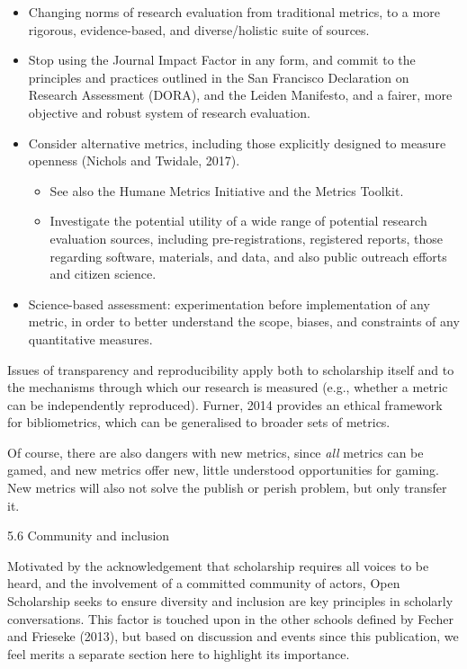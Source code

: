 \documentclass[]{article}
\begin{document}
\begin{itemize}
\item
  Changing norms of research evaluation from traditional metrics, to a
  more rigorous, evidence-based, and diverse/holistic suite of sources.
\item
  Stop using the Journal Impact Factor in any form, and commit to the
  principles and practices outlined in the San Francisco Declaration on
  Research Assessment (DORA), and the Leiden Manifesto, and a fairer,
  more objective and robust system of research evaluation.
\item
  Consider alternative metrics, including those explicitly designed to
  measure openness (Nichols and Twidale, 2017).

  \begin{itemize}
  \item
    See also the Humane Metrics Initiative and the Metrics Toolkit.
  \item
    Investigate the potential utility of a wide range of potential
    research evaluation sources, including pre-registrations, registered
    reports, those regarding software, materials, and data, and also
    public outreach efforts and citizen science.
  \end{itemize}
\item
  Science-based assessment: experimentation before implementation of any
  metric, in order to better understand the scope, biases, and
  constraints of any quantitative measures.
\end{itemize}

Issues of transparency and reproducibility apply both to scholarship
itself and to the mechanisms through which our research is measured
(e.g., whether a metric can be independently reproduced). Furner, 2014
provides an ethical framework for bibliometrics, which can be
generalised to broader sets of metrics.

Of course, there are also dangers with new metrics, since \emph{all}
metrics can be gamed, and new metrics offer new, little understood
opportunities for gaming. New metrics will also not solve the publish or
perish problem, but only transfer it.

5.6 Community and inclusion

Motivated by the acknowledgement that scholarship requires all voices to
be heard, and the involvement of a committed community of actors, Open
Scholarship seeks to ensure diversity and inclusion are key principles
in scholarly conversations. This factor is touched upon in the other
schools defined by Fecher and Frieseke (2013), but based on discussion
and events since this publication, we feel merits a separate section
here to highlight its importance.
\end{document}
